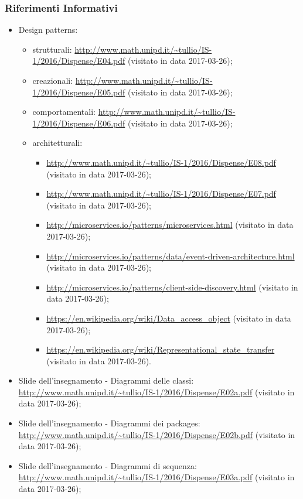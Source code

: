 	 \subsubsection{Riferimenti Informativi}
	  \begin{itemize}
	    \item Design patterns:
	      \begin{itemize}
	       \item strutturali:
	       \url{http://www.math.unipd.it/~tullio/IS-1/2016/Dispense/E04.pdf} (visitato in data 2017-03-26);
	       \item creazionali:
	       \url{http://www.math.unipd.it/~tullio/IS-1/2016/Dispense/E05.pdf} (visitato in data 2017-03-26);
	       \item comportamentali:
	       \url{http://www.math.unipd.it/~tullio/IS-1/2016/Dispense/E06.pdf} (visitato in data 2017-03-26);
	       \item architetturali:
	       \begin{itemize}
	       \item \url{http://www.math.unipd.it/~tullio/IS-1/2016/Dispense/E08.pdf} (visitato in data 2017-03-26);
	       \item \url{http://www.math.unipd.it/~tullio/IS-1/2016/Dispense/E07.pdf} (visitato in data 2017-03-26);
	       \item \url{http://microservices.io/patterns/microservices.html} (visitato in data 2017-03-26);
	       \item \url{http://microservices.io/patterns/data/event-driven-architecture.html} (visitato in data 2017-03-26);
	       \item \url{http://microservices.io/patterns/client-side-discovery.html} (visitato in data 2017-03-26);
	       \item \url{https://en.wikipedia.org/wiki/Data_access_object} (visitato in data 2017-03-26);
	       \item \url{https://en.wikipedia.org/wiki/Representational_state_transfer} (visitato in data 2017-03-26).
	       \end{itemize}
	      \end{itemize}
	    \item Slide dell’insegnamento - Diagrammi delle classi:
	    \url{http://www.math.unipd.it/~tullio/IS-1/2016/Dispense/E02a.pdf} (visitato in data 2017-03-26);
	    \item Slide dell’insegnamento - Diagrammi dei packages:
	    \url{http://www.math.unipd.it/~tullio/IS-1/2016/Dispense/E02b.pdf} (visitato in data 2017-03-26);
	    \item Slide dell’insegnamento - Diagrammi di sequenza:
	    \url{http://www.math.unipd.it/~tullio/IS-1/2016/Dispense/E03a.pdf} (visitato in data 2017-03-26);
	  \end{itemize}
